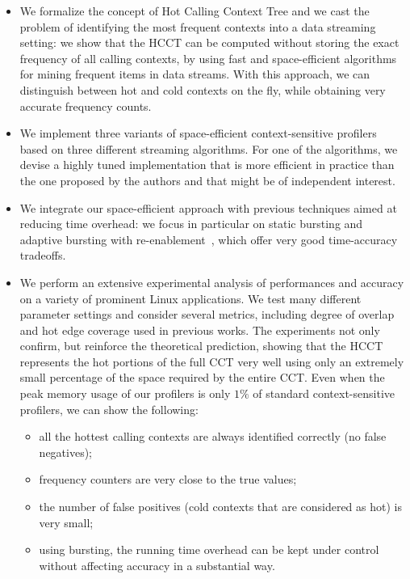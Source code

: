 \documentclass{sigplanconf}
\begin{document}
\begin{itemize}

\item We formalize the concept of Hot Calling Context Tree and we cast the problem of identifying the most frequent contexts into a data streaming setting: we show that the HCCT can be computed without storing the exact frequency of all calling contexts, by using fast and space-efficient algorithms for mining frequent items in data streams. With this approach, we can distinguish between hot and cold contexts on the fly, while obtaining very accurate frequency counts. 

\item We implement three variants of space-efficient context-sensitive profilers based on three different streaming algorithms. For one of the algorithms, we devise  a highly tuned implementation that is more efficient in practice than the one proposed by the authors and that might be of independent interest.  

\item We integrate our space-efficient approach with previous techniques aimed at reducing time overhead: we focus in particular on static bursting and adaptive bursting with re-enablement~\cite{ZSCC06}, which offer very good time-accuracy tradeoffs.

\item We perform an extensive experimental analysis of performances and accuracy on a variety of prominent Linux applications. We test many different parameter settings and consider several metrics, including degree of overlap and hot edge coverage used in previous works.  The experiments not only confirm, but reinforce the theoretical prediction, showing that the HCCT represents the hot portions of the full CCT very well using only an extremely small percentage of the space required by the entire CCT. Even when the peak memory usage of our profilers is only $1\%$ of standard context-sensitive profilers, we can show the following:

\begin{itemize}
\item all the hottest calling contexts are always identified correctly (no false negatives);

\item frequency counters are very close to the true values;

\item the number of false positives (cold contexts that are considered as hot) is very small;

\item using bursting, the running time overhead can be kept under control without affecting accuracy in a substantial way. 
\end{itemize} 

\end{itemize}
\end{document}
